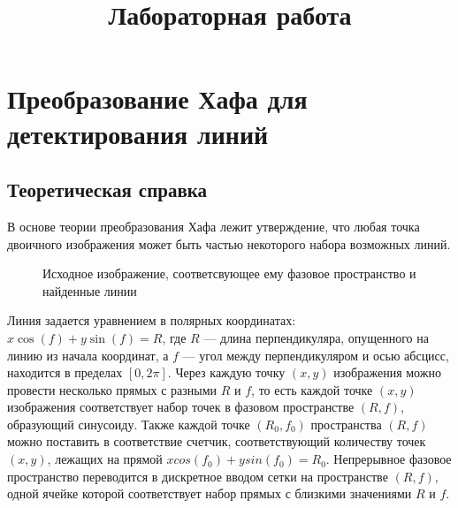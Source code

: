 \documentclass[fleqn]{article}
\title{Лабораторная работа}
\begin{document}
\maketitle

\section*{Преобразование Хафа для детектирования линий}
\subsection*{Теоретическая справка}
В основе теории преобразования Хафа лежит утверждение, что любая точка двоичного изображения может быть частью некоторого набора возможных линий.

\begin{figure}[h]
\caption{Исходное изображение, соответсвующее ему фазовое пространство и
найденные линии}
\label{ris:image}
\end{figure}

Линия задается уравнением в полярных координатах: $x \cos(f) + y \sin(f) = R$, где $R$ --- длина перпендикуляра, опущенного на линию из начала координат, а $f$ --- угол между перпендикуляром и осью абсцисс, находится в пределах $[0,2 \pi]$. Через каждую точку $(x, y)$ изображения можно провести несколько прямых с разными $R$ и $f$, то есть каждой точке $(x, y)$ изображения соответствует набор точек в фазовом пространстве $(R, f)$, образующий синусоиду. Также каждой точке $(R_0, f_0)$ пространства $(R, f)$ можно поставить в соответствие счетчик, соответствующий количеству точек $(x, y)$, лежащих на прямой $x cos(f_0) + y sin(f_0) = R_0$. Непрерывное фазовое пространство переводится в дискретное вводом сетки на пространстве $(R, f)$, одной ячейке которой соответствует набор прямых с близкими значениями $R$ и $f$.
\end{document}
